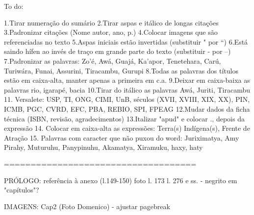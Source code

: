 To do:

1.Tirar numeração do sumário
2.Tirar aspas e itálico de longas citações
3.Padronizar citações (Nome autor, ano, p.)
4.Colocar imagens que são referenciadas no texto
5.Aspas iniciais estão invertidas (substituir " por ``)
6.Está saindo hífen ao invés de traço em grande parte do texto (substituir - por --)
7.Padronizar as palavras: Zo'é, Awá, Guajá, Ka'apor, Tenetehara, Carú, Turiwára, Funai, Assurini, Tiracambu, Gurupi
8.Todas as palavras dos títulos estão em caixa-alta, manter apenas a primeira em c.a.
9.Deixar em caixa-baixa as palavras rio, igarapé, bacia
10.Tirar do itálico as palavras Awá, Juriti, Tiracambu
11. Versalete: USP, TI, ONG, CIMI, UnB, séculos (XVII, XVIII, XIX, XX), PIN, ICMB, PGC, CVRD, EFC, PBA, REBIO, SPI, FPEAG 
12.Mudar dados da ficha técnica (ISBN, revisão, agradecimentos)
13.Italizar "apud" e colocar ., depois da expressão
14. Colocar em caixa-alta as expressões: Terra(s) Indígena(s), Frente de Atração
15. Palavras com caracter que não puxou do word: Juriximatya, Amy Pirahy, Muturuhu, Panypinuhu, Akamatya, Xiramuku, haxy, haty

====================================

PRÓLOGO: referência à anexo (l.149-150)
		 foto l. 173
		 l. 276 e ss. - negrito em "capítulos"?

IMAGENS: Cap2 (Foto Domenico) - ajustar pagebreak
